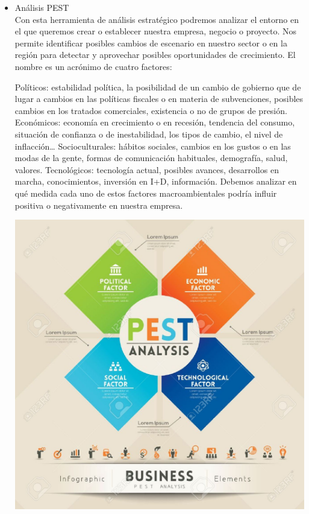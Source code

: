 \begin{itemize}
\item Análisis PEST
\\Con esta herramienta de análisis estratégico podremos analizar el entorno en el que queremos crear o establecer nuestra empresa, negocio o proyecto. Nos permite identificar posibles cambios de escenario en nuestro sector o en la región para detectar y aprovechar posibles oportunidades de crecimiento. El nombre es un acrónimo de cuatro factores:

Políticos: estabilidad política, la posibilidad de un cambio de gobierno que de lugar a cambios en las políticas fiscales o en materia de subvenciones, posibles cambios en los tratados comerciales, existencia o no de grupos de presión.
Económicos: economía en crecimiento o en recesión, tendencia del consumo, situación de confianza o de inestabilidad, los tipos de cambio, el nivel de inflacción…
Socioculturales: hábitos sociales, cambios en los gustos o en las modas de la gente, formas de comunicación habituales, demografía, salud, valores.
Tecnológicos: tecnología actual, posibles avances, desarrollos en marcha, conocimientos, inversión en I+D, información.
Debemos analizar en qué medida cada uno de estos factores macroambientales podría influir positiva o negativamente en nuestra empresa.  
		\begin{center}
		\includegraphics[width=15cm]{./Imagenes/Imagen1}
		\end{center}

	\end{itemize} 
	
